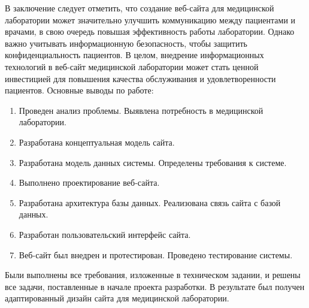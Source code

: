 \newsection
{}

В заключение следует отметить, что создание веб-сайта для медицинской лаборатории может значительно улучшить коммуникацию между пациентами и врачами, в свою очередь повышая эффективность работы лаборатории. Однако важно учитывать информационную безопасность, чтобы защитить конфиденциальность пациентов. В целом, внедрение информационных технологий в веб-сайт медицинской лаборатории может стать ценной инвестицией для повышения качества обслуживания и удовлетворенности пациентов.
Основные выводы по работе:

\begin{enumerate}
\item Проведен анализ проблемы. Выявлена потребность в медицинской лаборатории.
\item Разработана концептуальная модель сайта.
\item Разработана модель данных системы. Определены требования к системе.
\item Выполнено проектирование веб-сайта. 
\item Разработана архитектура базы данных. Реализована связь сайта с базой данных. 
\item Разработан пользовательский интерфейс сайта.
\item Веб-сайт был внедрен и протестирован. Проведено тестирование системы.
\end{enumerate}

Были выполнены все требования, изложенные в техническом задании, и решены все задачи, поставленные в начале проекта разработки. В результате был получен адаптированный дизайн сайта для медицинской лаборатории.